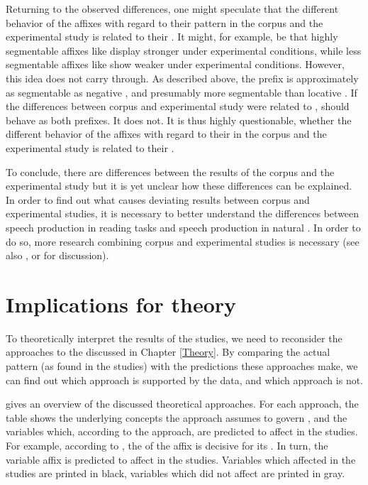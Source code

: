 Returning to the observed differences, one might speculate that the different behavior of the affixes with regard to their  pattern in the corpus and the experimental study is related to their . It might, for example, be that highly segmentable affixes like  display stronger  under experimental conditions, while less segmentable affixes like  show weaker  under experimental conditions. However, this idea does not carry through. As described above, the prefix  is approximately as segmentable as negative , and presumably more segmentable than locative . If the differences between corpus and experimental study were related to ,  should behave as both prefixes. It does not. %
It is thus highly questionable, whether the different behavior of the affixes with regard to their  in the corpus and the experimental study is related to their .

To conclude, there are differences between the results of the corpus and the experimental study but it is yet unclear how these differences can be explained. In order to find out what causes deviating results between corpus and experimental studies, it is necessary to better understand the differences between speech production in reading tasks and speech production in natural . In order to do so, more research combining corpus and experimental studies is necessary (see also , or \cite{Arppe.2007} for discussion). 





\section{Implications for theory}


To theoretically interpret the results of the studies, we need to reconsider the approaches to the  discussed in Chapter \ref{Theory}.   By comparing the actual  pattern (as found in the studies) with the predictions these approaches make, we can find out which approach is supported by the data, and which approach is not.



 gives an overview of the discussed theoretical approaches. For each approach, the table shows the underlying concepts the approach assumes to govern , and the variables which, according to the approach, are predicted to affect  in the studies. For example, according to , the  of the affix is decisive for its . In turn, the variable affix is predicted to affect  in the studies. 
Variables which affected  in the studies are printed in black, variables which did not affect  are printed in gray.






